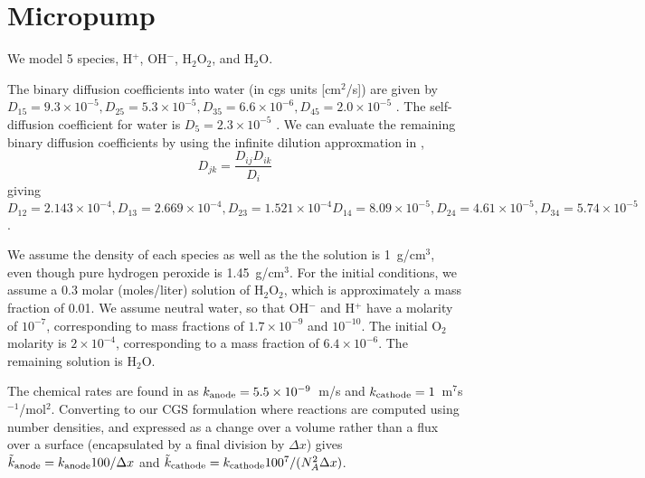 \documentclass[final]{siamltex}
\begin{document}
\section{Micropump}
We model 5 species, H$^+$, OH$^-$, H$_2$O$_2$, and H$_2$O.

The binary diffusion coefficients into water (in cgs units [cm$^2$/s]) are given by 
$D_{15}=9.3\times 10^{-5}, D_{25}=5.3\times 10^{-5}, D_{35}=6.6\times 10^{-6}, 
D_{45}=2.0\times 10^{-5}$ \cite{Esplandiu16,MoranPosner11}.  The self-diffusion
coefficient for water is $D_5=2.3\times 10^{-5}$ \cite{LowMachMulti}.
We can evaluate the remaining binary diffusion coefficients by using the
infinite dilution approxmation in \cite{LowMachMulti},
\begin{equation}
D_{jk} = \frac{D_{ij}D_{ik}}{D_i}
\end{equation}
giving
$D_{12}=2.143\times 10^{-4},
D_{13}=2.669\times 10^{-4}, D_{23}=1.521\times 10^{-4}
D_{14}=8.09\times 10^{-5}, D_{24}=4.61\times 10^{-5}, D_{34}=5.74\times 10^{-5}$.

We assume the density of each species as well as the the solution is 1~g/cm$^3$,
even though pure hydrogen peroxide is 1.45~g/cm$^3$.  For the initial conditions,
we assume a 0.3 molar (moles/liter) solution of H$_2$O$_2$, which is approximately
a mass fraction of 0.01.  We assume neutral water, so that OH$^-$ and H$^+$ have
a molarity of $10^{-7}$, corresponding to mass fractions of $1.7\times 10^{-9}$
and $10^{-10}$.  The initial O$_2$ molarity is $2\times 10^{-4}$, corresponding
to a mass fraction of $6.4\times 10^{-6}$.  The remaining solution is H$_2$O.

The chemical rates are found in \cite{MoranPosner11} as $k_{\rm anode}=5.5\times 10^{-9}$~m/s
and $k_{\rm cathode}=1$~m$^7$s$^{-1}$/mol$^2$.  Converting to our CGS formulation where
reactions are computed using number densities, and expressed as a change over a volume
rather than a flux over a surface (encapsulated by a final division by $\Delta x$) gives
$\tilde k_{\rm anode} = k_{\rm anode} 100 / \Delta x$ and
$\tilde k_{\rm cathode} = k_{\rm cathode} 100^7 / (N_A^2 \Delta x)$.



\end{document}
